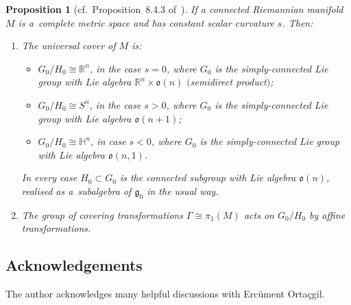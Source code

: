 \documentclass[pdftex]{sigma}
\numberwithin{equation}{section}
\newtheorem{PropositionBlaom}[TheoremBlaom]{Proposition}
 { \theoremstyle{definition}
\newtheorem{CounterexampleBlaom}[TheoremBlaom]{Counterexample}
\newtheorem{RemarkBlaom}[TheoremBlaom]{Remark} }
\begin{document}
\begin{PropositionBlaom}[cf.~Proposition~8.4.3 of~\cite{doCarmo_92}]\label{Proposition7.2}
  If a connected Riemannian manifold $M$ is a~complete metric space
  and has constant scalar curvature $s$. Then:
  \begin{enumerate}\itemsep=0pt
    \item[$(1)$] The universal cover of $M$ is:
      \begin{itemize}\itemsep=0pt
      \item $G_0/H_0\cong {\mathbb R}^n$, in the case $s=0$, where $G_0$
        is the simply-connected Lie group with Lie algebra ${\mathbb
          R}^n \times \mathfrak{o}(n)$ $($semidirect product$)$;
      \item $G_0/H_0 \cong S^n$, in the case $s>0$, where $G_0$ is the simply-connected
        Lie group with Lie algebra $\mathfrak{o}(n+1)$;
      \item $G_0/H_0\cong {\mathbb H}^n$, in case $s<0$, where $G_0$
        is the simply-connected Lie group with Lie algebra
        $\mathfrak{o}(n,1)$.
      \end{itemize}
      In every case $H_0 \subset G_0$ is the connected subgroup with
      Lie algebra $\mathfrak{o}(n)$, realised as a~subalgebra of
      ${\mathfrak g}_0$ in the usual way.
    \item[$(2)$] The group of covering transformations $\Gamma \cong
      \pi_1(M)$ acts on $G_0/H_0$ by affine transformations.
    \end{enumerate}
\end{PropositionBlaom}

\vspace{-2.5mm}

\subsection*{Acknowledgements} The author acknowledges many helpful
discussions with Erc\"ument Orta\c{c}gil.
\vspace{-2mm}
\end{document}
